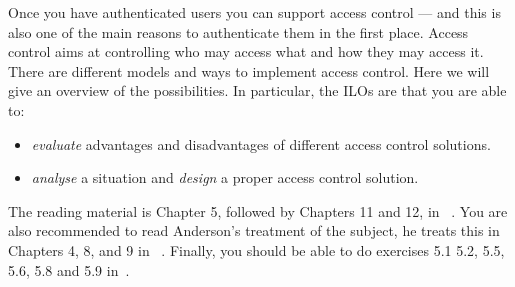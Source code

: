Once you have authenticated users you can support access control --- and this 
is also one of the main reasons to authenticate them in the first place.
Access control aims at controlling who may access what and how they may access 
it.
There are different models and ways to implement access control.
Here we will give an overview of the possibilities.
In particular, the \acp{ILO} are that you are able to:
\begin{itemize}
  \item \emph{evaluate} advantages and disadvantages of different access 
    control solutions.
  \item \emph{analyse} a situation and \emph{design} a proper access control 
    solution.
\end{itemize}

The reading material is Chapter 5, followed by Chapters 11 and 12, in 
~\cite{Gollmann2011cs}.
You are also recommended to read Anderson's treatment of the subject, he treats 
this in Chapters 4, 8, and 9 in 
~\cite{Anderson2008sea}.
Finally, you should be able to do exercises 5.1 5.2, 5.5, 5.6, 5.8 and 5.9 
in~\cite{Gollmann2011cs}.

